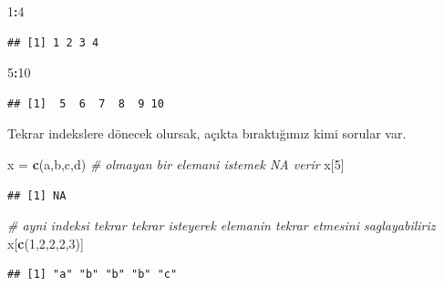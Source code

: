\documentclass[
]{book}
\newenvironment{Shaded}{\begin{snugshade}}{\end{snugshade}}
\newcommand{\CommentTok}[1]{\textcolor[rgb]{0.56,0.35,0.01}{\textit{#1}}}
\newcommand{\DecValTok}[1]{\textcolor[rgb]{0.00,0.00,0.81}{#1}}
\newcommand{\KeywordTok}[1]{\textcolor[rgb]{0.13,0.29,0.53}{\textbf{#1}}}
\newcommand{\NormalTok}[1]{#1}
\newcommand{\OperatorTok}[1]{\textcolor[rgb]{0.81,0.36,0.00}{\textbf{#1}}}
\newcommand{\StringTok}[1]{\textcolor[rgb]{0.31,0.60,0.02}{#1}}
\begin{document}
\begin{Shaded}
\begin{Highlighting}[]
\DecValTok{1}\OperatorTok{:}\DecValTok{4}
\end{Highlighting}
\end{Shaded}

\begin{verbatim}
## [1] 1 2 3 4
\end{verbatim}

\begin{Shaded}
\begin{Highlighting}[]
\DecValTok{5}\OperatorTok{:}\DecValTok{10}
\end{Highlighting}
\end{Shaded}

\begin{verbatim}
## [1]  5  6  7  8  9 10
\end{verbatim}

Tekrar indekslere dönecek olursak, açıkta bıraktığımız kimi sorular var.

\begin{Shaded}
\begin{Highlighting}[]
\NormalTok{x =}\StringTok{ }\KeywordTok{c}\NormalTok{(}\StringTok{\textquotesingle{}a\textquotesingle{}}\NormalTok{,}\StringTok{\textquotesingle{}b\textquotesingle{}}\NormalTok{,}\StringTok{\textquotesingle{}c\textquotesingle{}}\NormalTok{,}\StringTok{\textquotesingle{}d\textquotesingle{}}\NormalTok{)}
\CommentTok{\# olmayan bir elemani istemek NA verir}
\NormalTok{x[}\DecValTok{5}\NormalTok{]}
\end{Highlighting}
\end{Shaded}

\begin{verbatim}
## [1] NA
\end{verbatim}

\begin{Shaded}
\begin{Highlighting}[]
\CommentTok{\# ayni indeksi tekrar tekrar isteyerek elemanin tekrar etmesini saglayabiliriz}
\NormalTok{x[}\KeywordTok{c}\NormalTok{(}\DecValTok{1}\NormalTok{,}\DecValTok{2}\NormalTok{,}\DecValTok{2}\NormalTok{,}\DecValTok{2}\NormalTok{,}\DecValTok{3}\NormalTok{)]}
\end{Highlighting}
\end{Shaded}

\begin{verbatim}
## [1] "a" "b" "b" "b" "c"
\end{verbatim}
\end{document}
